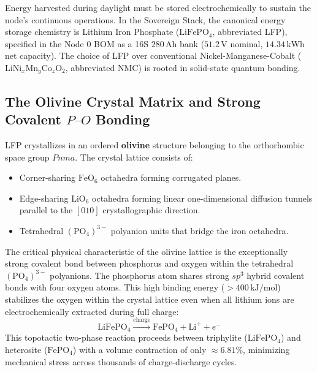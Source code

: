 Energy harvested during daylight must be stored electrochemically to sustain the node's continuous operations. In the Sovereign Stack, the canonical energy storage chemistry is Lithium Iron Phosphate ($\mathrm{LiFePO}_4$, abbreviated LFP), specified in the Node 0 BOM as a 16S $280\,\mathrm{Ah}$ bank ($51.2\,\mathrm{V}$ nominal, $14.34\,\mathrm{kWh}$ net capacity). The choice of LFP over conventional Nickel-Manganese-Cobalt ($\mathrm{LiNi}_x\mathrm{Mn}_y\mathrm{Co}_z\mathrm{O}_2$, abbreviated NMC) is rooted in solid-state quantum bonding.

\subsection{The Olivine Crystal Matrix and Strong Covalent \texorpdfstring{$P\text{--}O$}{P-O} Bonding}

LFP crystallizes in an ordered \textbf{olivine} structure belonging to the orthorhombic space group $Pnma$. The crystal lattice consists of:
\begin{itemize}
    \item Corner-sharing $\mathrm{FeO}_6$ octahedra forming corrugated planes.
    \item Edge-sharing $\mathrm{LiO}_6$ octahedra forming linear one-dimensional diffusion tunnels parallel to the $[010]$ crystallographic direction.
    \item Tetrahedral $(\mathrm{PO}_4)^{3-}$ polyanion units that bridge the iron octahedra.
\end{itemize}

The critical physical characteristic of the olivine lattice is the exceptionally strong covalent bond between phosphorus and oxygen within the tetrahedral $(\mathrm{PO}_4)^{3-}$ polyanions. The phosphorus atom shares strong $sp^3$ hybrid covalent bonds with four oxygen atoms. This high binding energy ($>400\,\mathrm{kJ/mol}$) stabilizes the oxygen within the crystal lattice even when all lithium ions are electrochemically extracted during full charge:
\begin{equation}
\mathrm{LiFePO}_4 \xrightarrow{\text{charge}} \mathrm{FePO}_4 + \mathrm{Li}^+ + e^-
\label{eq:lfp_delithiation}
\end{equation}
This topotactic two-phase reaction proceeds between triphylite ($\mathrm{LiFePO}_4$) and heterosite ($\mathrm{FePO}_4$) with a volume contraction of only $\approx 6.81\%$, minimizing mechanical stress across thousands of charge-discharge cycles.

